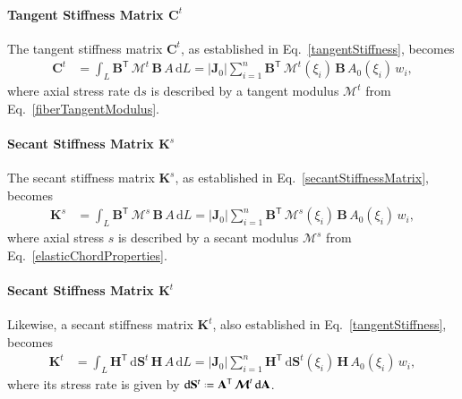 \paragraph{Tangent Stiffness Matrix $\mathbf{C}^t$}

The tangent stiffness matrix $\mathbf{C}^t$, as established in Eq.~\ref{tangentStiffness}, becomes
\begin{subequations}
	\begin{align}
		\mathbf{C}^t & = \int_L \mathbf{B}^{\mathsf{T}} \,  \boldsymbol{\mathcal{M}}^t \, \mathbf{B}  \, A \,  \mathrm{d} L
		= |\mathbf{J}_0| \sum_{i=1}^{n}   \mathbf{B}^{\mathsf{T}} \, \boldsymbol{\mathcal{M}}^t (\xi_i) \, \mathbf{B} \, A_0 (\xi_i) \, w_i ,
	\end{align}
\end{subequations} 
where axial stress rate $\mathrm{d} s$ is described by a tangent modulus $\boldsymbol{\mathcal{M}}^t$ from Eq.~\ref{fiberTangentModulus}.


\paragraph{Secant Stiffness Matrix $\mathbf{K}^s$}

The secant stiffness matrix $\mathbf{K}^s$, as established in Eq.~\ref{secantStiffnessMatrix}, becomes
\begin{subequations}
	\begin{align}
		\mathbf{K}^s & = \int_L \mathbf{B}^{\mathsf{T}} \,  \boldsymbol{\mathcal{M}}^s \, \mathbf{B}  \, A \,  \mathrm{d} L
		= |\mathbf{J}_0| \sum_{i=1}^{n}  \mathbf{B}^{\mathsf{T}} \, \boldsymbol{\mathcal{M}}^s (\xi_i) \, \mathbf{B} \, A_0 (\xi_i) \, w_i  ,
	\end{align}
\end{subequations} 
where axial stress $s$ is described by a secant modulus $\boldsymbol{\mathcal{M}}^{s}$ from Eq.~\ref{elasticChordProperties}.


\paragraph{Secant Stiffness Matrix $\mathbf{K}^t$}

Likewise, a secant stiffness matrix $\mathbf{K}^t$, also established in Eq.~\ref{tangentStiffness}, becomes 
\begin{subequations}
	\begin{align}
		\mathbf{K}^t & = \int_L \mathbf{H}^{\mathsf{T}} \,  \mathrm{d} \mathbf{S}^t \, \mathbf{H}  \, A \,  \mathrm{d} L
		= | \mathbf{J}_0 | \sum_{i=1}^{n}  \mathbf{H}^{\mathsf{T}} \,  \mathrm{d} \mathbf{S}^t (\xi_i) \, \mathbf{H} \, A_0 (\xi_i) \, w_i ,
	\end{align}
\end{subequations}
where its stress rate is given by $\mathrm{d} \mathbf{S}^t \defeq \mathbf{A}^{\mathsf{T}} \, \boldsymbol{\mathcal{M}}^t \, \mathrm{d} \mathbf{A}$.


